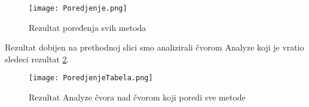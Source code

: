 \documentclass[a4paper]{article}
\begin{document}
\begin{figure}[ht!]
    \centering
    \texttt{[image: Poredjenje.png]}
    \caption{Rezultat poređenja svih metoda}
    \label{fig:Poredjenje}
\end{figure}

Rezultat dobijen na prethodnoj slici smo analizirali čvorom Analyze koji je vratio sledeci rezultat \ref{fig:PoredjenjeTabela}.

\begin{figure}[ht!]
    \centering
    \texttt{[image: PoredjenjeTabela.png]}
    \caption{Rezultat Analyze čvora nad čvorom koji poredi sve metode}
    \label{fig:PoredjenjeTabela}
\end{figure}

\appendix
 

\end{document}
